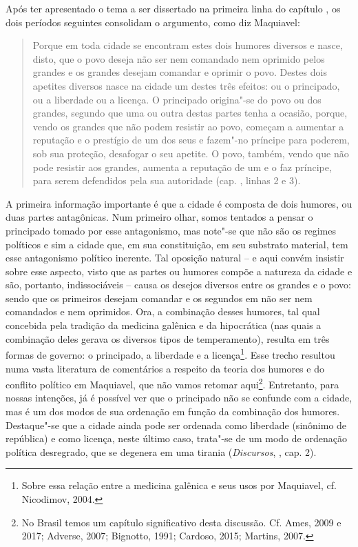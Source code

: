 Após ter apresentado o tema a ser dissertado na primeira linha do
capítulo , os dois períodos seguintes consolidam o argumento, como diz
Maquiavel:

\begin{quote}
Porque em toda cidade se encontram estes dois humores diversos e nasce,
disto, que o povo deseja não ser nem comandado nem oprimido pelos
grandes e os grandes desejam comandar e oprimir o povo. Destes dois
apetites diversos nasce na cidade um destes três efeitos: ou o
principado, ou a liberdade ou a licença. O principado origina"-se do povo
ou dos grandes, segundo que uma ou outra destas partes tenha a ocasião,
porque, vendo os grandes que não podem resistir ao povo, começam a
aumentar a reputação e o prestígio de um dos seus e fazem"-no príncipe
para poderem, sob sua proteção, desafogar o seu apetite. O povo, também,
vendo que não pode resistir aos grandes, aumenta a reputação de um e o
faz príncipe, para serem defendidos pela sua autoridade (cap. ,
linhas 2 e 3).
\end{quote}

A primeira informação importante é que a cidade é composta de dois
humores, ou duas partes antagônicas. Num primeiro olhar, somos tentados
a pensar o principado tomado por esse antagonismo, mas note"-se que não
são os regimes políticos e sim a cidade que, em sua constituição, em seu
substrato material, tem esse antagonismo político inerente. Tal oposição
natural -- e aqui convém insistir sobre esse aspecto, visto que as
partes ou humores compõe a natureza da cidade e são, portanto,
indissociáveis -- causa os desejos diversos entre os grandes e o povo:
sendo que os primeiros desejam comandar e os segundos em não ser nem
comandados e nem oprimidos. Ora, a combinação desses humores, tal qual
concebida pela tradição da medicina galênica e da hipocrática (nas quais
a combinação deles gerava os diversos tipos de temperamento), resulta em
três formas de governo: o principado, a liberdade e a licença\footnote{Sobre
  essa relação entre a medicina galênica e seus usos por Maquiavel, cf.
  Nicodimov, 2004.}. Esse trecho resultou numa vasta literatura de
comentários a respeito da teoria dos humores e do conflito político em
Maquiavel, que não vamos retomar aqui\footnote{No Brasil temos um
  capítulo significativo desta discussão. Cf. Ames, 2009 e 2017;
  Adverse, 2007; Bignotto, 1991; Cardoso, 2015; Martins, 2007.}.
Entretanto, para nossas intenções, já é possível ver que o principado
não se confunde com a cidade, mas é um dos modos de sua ordenação em
função da combinação dos humores. Destaque"-se que a cidade ainda pode
ser ordenada como liberdade (sinônimo de república) e como licença,
neste último caso, trata"-se de um modo de ordenação política desregrado,
que se degenera em uma tirania (\emph{Discursos}, , cap. 2).


